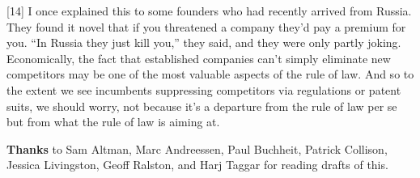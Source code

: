 {[}14{]} I once explained this to some founders who had recently arrived
from Russia. They found it novel that if you threatened a company they'd
pay a premium for you. ``In Russia they just kill you,'' they said, and
they were only partly joking. Economically, the fact that established
companies can't simply eliminate new competitors may be one of the most
valuable aspects of the rule of law. And so to the extent we see
incumbents suppressing competitors via regulations or patent suits, we
should worry, not because it's a departure from the rule of law per se
but from what the rule of law is aiming at.

\textbf{Thanks} to Sam Altman, Marc Andreessen, Paul Buchheit, Patrick
Collison, Jessica Livingston, Geoff Ralston, and Harj Taggar for reading
drafts of this.
